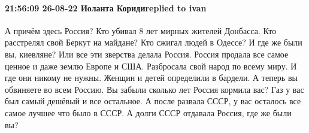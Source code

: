  
 
 
 
 

\paragraph{21:56:09 26-08-22 Иоланта Коридиreplied to ivan}

А причём здесь Россия? Кто убивал 8 лет мирных жителей Донбасса. Кто расстрелял
свой Беркут на майдане? Кто сжигал людей в Одессе? И где же были вы, киевляне?
Или все эти зверства делала Россия. Россия продала все самое ценное и даже
землю Европе и США. Разбросала свой народ по всему миру. И где они никому не
нужны. Женщин и детей определили в бардели. А теперь вы обвиняете во всем
Россию. Вы забыли сколько лет Россия кормила вас? Газ у вас был самый дешёвый и
все остальное. А после развала СССР, у вас осталось все самое лучшее что было в
СССР. А долги СССР отдавала Россия, где же были вы?
